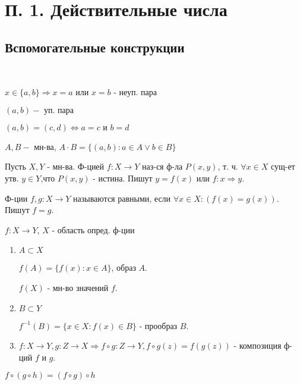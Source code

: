 \section{П. 1. Действительные числа}
\subsection{Вспомогательные конструкции}
~\newline

$x \in \{a, b\} \Rightarrow x = a \text{ или } x = b$ - неуп. пара 

$(a, b) - \text{ уп. пара}$

 $(a, b) = (c, d) \iff a = c \text{ и } b = d$

$A, B - \text{ мн-ва}$, $A \cdot B = \{(a, b) \colon a \in A \lor b \in B\}$

\begin{definition}
Пусть $X, Y$ - мн-ва.
Ф-цией $f\colon X \rightarrow Y$ наз-ся ф-ла $P(x, y)$, т. ч. $\forall x \in X$ сущ-ет утв. $y \in Y$,что $P(x, y)$ - истина. Пишут $y = f(x)$ или $f\colon x \Rightarrow y$.
\end{definition}
\begin{definition}
Ф-ции $f, g\colon X \rightarrow Y$ называются равными, если $\forall x \in X \colon (f(x) = g(x))$. Пишут $f = g$.
\end{definition}

\begin{symb}
$f: X \rightarrow Y$, $X$ - область опред. ф-ции

\begin{enumerate}
    \item $A \subset X$ 

    $f(A) = \{f(x) \colon x \in A\}$, образ $A$.

    $f(X)$ - мн-во значений $f$.

    \item $B \subset Y$

    $f^{-1}(B) = \{x \in X \colon f(x) \in B\}$ - прообраз $B$.

    \item $f: X \rightarrow Y, g: Z \rightarrow X \Rightarrow f \circ g: Z \rightarrow Y, f \circ g(z) = f(g(z))$ - композиция ф-ций $f$ и $g$.
\end{enumerate}
\end{symb}

\begin{statement}
$f \circ (g \circ h) = (f \circ g) \circ h$
\end{statement}

